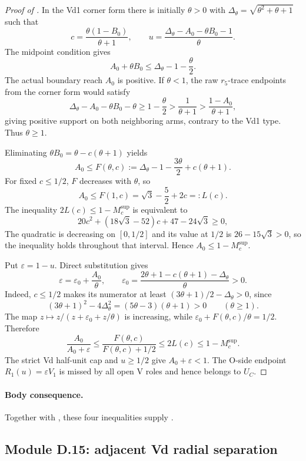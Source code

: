 \begin{proof}[Proof of ]
In the Vd1 corner form there is initially $\theta>0$ with
$\Delta_\theta=\sqrt{\theta^2+\theta+1}$ such that
\[
 c=\frac{\theta(1-B_0)}{\theta+1},
 \qquad
 u=\frac{\Delta_\theta-A_0-\theta B_0-1}{\theta}.
\]
The midpoint condition gives
\[
 A_0+\theta B_0\le\Delta_\theta-1-\frac\theta2.
\]
The actual boundary reach $A_0$ is positive.  If $\theta<1$, the raw
$r_5$-trace endpoints from the corner form would satisfy
\[
 \Delta_\theta-A_0-\theta B_0-\theta
 \ge1-\frac\theta2
 >\frac1{\theta+1}
 >\frac{1-A_0}{\theta+1},
\]
giving positive support on both neighboring arms, contrary to the Vd1 type.
Thus $\theta\ge1$.

Eliminating $\theta B_0=\theta-c(\theta+1)$ yields
\[
 A_0\le F(\theta,c):=
 \Delta_\theta-1-\frac{3\theta}{2}+c(\theta+1).
\]
For fixed $c\le1/2$, $F$ decreases with $\theta$, so
\[
 A_0\le F(1,c)=\sqrt3-\frac52+2c=:L(c).
\]
The inequality $2L(c)\le1-M_c^{\mathrm{sup}}$ is equivalent to
\[
 20c^2+(18\sqrt3-52)c+47-24\sqrt3\ge0,
\]
The quadratic is decreasing on $[0,1/2]$ and its value at $1/2$ is
$26-15\sqrt3>0$, so the inequality holds throughout that interval.  Hence
$A_0\le1-M_c^{\mathrm{sup}}$.

Put $\varepsilon=1-u$.  Direct substitution gives
\[
 \varepsilon=\varepsilon_0+\frac{A_0}{\theta},
 \qquad
 \varepsilon_0=
 \frac{2\theta+1-c(\theta+1)-\Delta_\theta}{\theta}>0.
\]
Indeed, $c\le1/2$ makes its numerator at least
$(3\theta+1)/2-\Delta_\theta>0$, since
\[
 (3\theta+1)^2-4\Delta_\theta^2
 =(5\theta-3)(\theta+1)>0
 \qquad(\theta\ge1).
\]
The map $z\mapsto z/(z+\varepsilon_0+z/\theta)$ is increasing, while
$\varepsilon_0+F(\theta,c)/\theta=1/2$.  Therefore
\[
 \frac{A_0}{A_0+\varepsilon}
 \le\frac{F(\theta,c)}{F(\theta,c)+1/2}
 \le2L(c)\le1-M_c^{\mathrm{sup}}.
\]
The strict Vd half-unit cap and $u\ge1/2$ give
$A_0+\varepsilon<1$.  The O-side
endpoint $R_1(u)=\varepsilon V_1$ is missed by all open V roles and hence
belongs to $U_C$.
\end{proof}

\paragraph{Body consequence.}
Together with , these four inequalities
supply .

\subsection{Module D.15: adjacent Vd radial separation}


